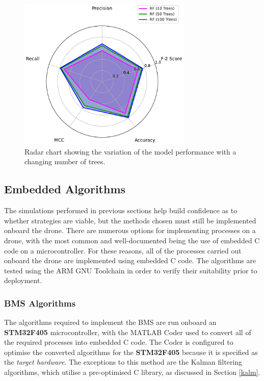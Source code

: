 \begin{figure}[H]
\centering
\includegraphics[width=0.74\textwidth]{figs/Samuel/Figures/rf_comparison (4) (1) (1).pdf}
\caption[Radar chart showing the performance of the random forest model]{Radar chart showing the variation of the model performance with a changing number of trees.}
\label{fig:radchart}
\end{figure}






\subsection{Embedded Algorithms}

The simulations performed in previous sections help build confidence as to whether strategies are viable, but the methods chosen must still be implemented onboard the drone. There are numerous options for implementing processes on a drone, with the most common and well-documented being the use of embedded C code on a microcontroller. For these reasons, all of the processes carried out onboard the drone are implemented using embedded C code. The algorithms are tested using the ARM GNU Toolchain in order to verify their suitability prior to deployment.

\subsubsection{\gls{BMS} Algorithms}

The algorithms required to implement the \gls{BMS} are run onboard an \textbf{STM32F405} microcontroller, with the MATLAB Coder used to convert all of the required processes into embedded C code. The Coder is configured to optimise the converted algorithms for the \textbf{STM32F405} because it is specified as the \textit{target hardware}. The exceptions to this method are the Kalman filtering algorithms, which utilise a pre-optimised C library, as discussed in Section \ref{kalm}. 

